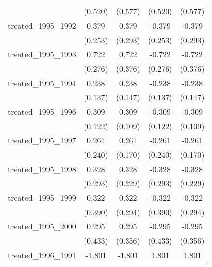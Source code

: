{\begin{tabular}{l*{4}{c}}
            &     (0.520)         &     (0.577)         &     (0.520)         &     (0.577)         \\
[1em]
treated\_1995\_1992&       0.379         &       0.379         &      -0.379         &      -0.379         \\
            &     (0.253)         &     (0.293)         &     (0.253)         &     (0.293)         \\
[1em]
treated\_1995\_1993&       0.722\sym{**} &       0.722         &      -0.722\sym{**} &      -0.722         \\
            &     (0.276)         &     (0.376)         &     (0.276)         &     (0.376)         \\
[1em]
treated\_1995\_1994&       0.238         &       0.238         &      -0.238         &      -0.238         \\
            &     (0.137)         &     (0.147)         &     (0.137)         &     (0.147)         \\
[1em]
treated\_1995\_1996&       0.309\sym{*}  &       0.309\sym{**} &      -0.309\sym{*}  &      -0.309\sym{**} \\
            &     (0.122)         &     (0.109)         &     (0.122)         &     (0.109)         \\
[1em]
treated\_1995\_1997&       0.261         &       0.261         &      -0.261         &      -0.261         \\
            &     (0.240)         &     (0.170)         &     (0.240)         &     (0.170)         \\
[1em]
treated\_1995\_1998&       0.328         &       0.328         &      -0.328         &      -0.328         \\
            &     (0.293)         &     (0.229)         &     (0.293)         &     (0.229)         \\
[1em]
treated\_1995\_1999&       0.322         &       0.322         &      -0.322         &      -0.322         \\
            &     (0.390)         &     (0.294)         &     (0.390)         &     (0.294)         \\
[1em]
treated\_1995\_2000&       0.295         &       0.295         &      -0.295         &      -0.295         \\
            &     (0.433)         &     (0.356)         &     (0.433)         &     (0.356)         \\
[1em]
treated\_1996\_1991&      -1.801         &      -1.801         &       1.801         &       1.801         \\

\end{tabular}}
